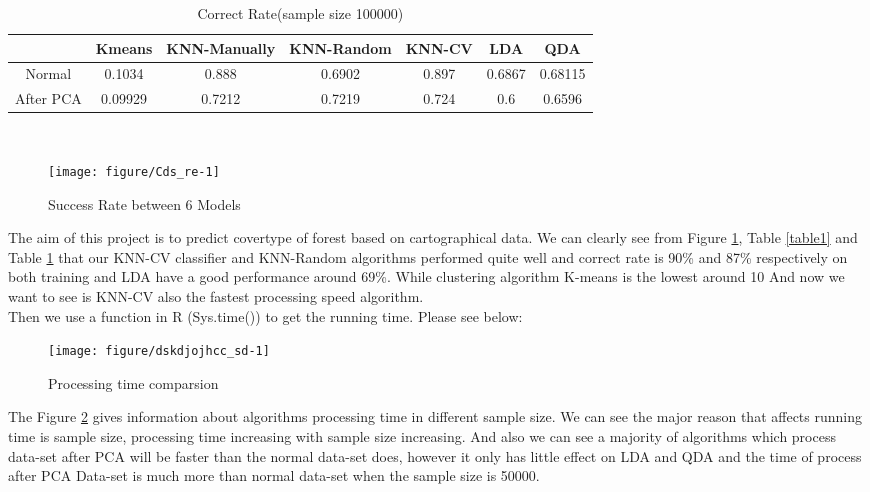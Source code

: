 \documentclass{article}\usepackage[]{graphicx}\usepackage[]{color}
\newenvironment{knitrout}{}{} %
\begin{document}
	\begin{table}[!hbp]
		\begin{tabular}{|c|c|c|c|c|c|c|}
		\hline
		 &Kmeans &KNN-Manually &KNN-Random &KNN-CV&LDA&QDA \\
		\hline
		Normal & 0.1034  & 0.888&0.6902&0.897&0.6867&0.68115 \\
		\hline
		After PCA & 0.09929 & 0.7212&0.7219&0.724&0.6&0.6596 \\
		\hline
	\end{tabular}
	\caption{Correct Rate(sample size 100000)}
	\label{table2}
	\end{table}
	\\
\begin{knitrout}
\color{fgcolor}

{\begin{figure}[h!]
	\caption{Success Rate between 6 Models}
	\centering \texttt{[image: figure/Cds\_re-1]} 
	\label{fig5}
\end{figure}
}



\end{knitrout}
	\noindent The aim of this project is to predict covertype of forest based on cartographical data. 
	\noindent We can clearly see from Figure \ref{fig5}, Table \ref{table1} and Table \ref{table2} that our KNN-CV classifier and KNN-Random algorithms performed quite well and correct rate is 90\% and 87\% respectively on both training and LDA have a good performance around 69\%. While clustering algorithm K-means is the lowest around 10%
	\noindent And now we want to see is KNN-CV also the fastest processing speed algorithm.\\
	\noindent	Then we use a function in R (Sys.time()) to get the running time. Please see below:\\
\begin{knitrout}
\color{fgcolor}

{\begin{figure}[h!]
	\caption{Processing time comparsion}
	\centering \texttt{[image: figure/dskdjojhcc\_sd-1]} 
	\label{fig7}
	\end{figure}
}



\end{knitrout}
	\noindent	The Figure \ref{fig7} gives information about algorithms processing time in different sample size. We can see the major reason that affects running time 
	is sample size, processing time increasing with sample size increasing. And also we can see a majority of algorithms which process data-set after PCA will be faster than the normal data-set does, 
	however it only has little effect on LDA and QDA and the time of process after PCA Data-set is much more than normal data-set when the sample size is 50000.\\
\end{document}
